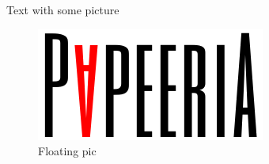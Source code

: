 \documentclass{article}
\begin{document}
\vspace*{\fill} \vspace*{-5ex}

Text with some picture 
\begin{figure}[tbp]
    \begin{center}
        \includegraphics{papeeria.png}
    \end{center}
    \caption{Floating pic}
\end{figure}


\vspace*{\fill}
\end{document}
